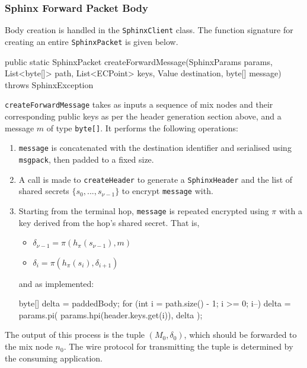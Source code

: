 \documentclass[final,dissertation.tex]{subfiles}
\begin{document}
\subsubsection{Sphinx Forward Packet Body}

Body creation is handled in the \verb|SphinxClient| class.  The function signature for creating an entire \verb|SphinxPacket| is given below.

\begin{javacode}
public static SphinxPacket createForwardMessage(SphinxParams params,
    List<byte[]> path,
    List<ECPoint> keys,
    Value destination,
    byte[] message) throws SphinxException
\end{javacode}

\verb|createForwardMessage| takes as inputs a sequence of mix nodes and their corresponding public keys as per the header generation section above, and a message $m$ of type \verb|byte[]|. It performs the following operations:

\begin{enumerate}
	\item \verb|message| is concatenated with the destination identifier and serialised using \verb|msgpack|, then padded to a fixed size.
	\item A call is made to \verb|createHeader| to generate a \verb|SphinxHeader| and the list of shared secrets $\{s_0,...,s_{\nu-1}\}$ to encrypt \verb|message| with.
	\item Starting from the terminal hop, \verb|message| is repeated encrypted using $\pi$ with a key derived from the hop's shared secret. That is,
		\begin{itemize}
			\setlength\itemsep{-0em}
			\item $\delta_{\nu-1} = \pi(h_\pi(s_{\nu-1}), m)$
			\item $\delta_i = \pi(h_\pi(s_{i}), \delta_{i+1})$
		\end{itemize}
	and as implemented:
	\begin{javacode}
byte[] delta = paddedBody;
for (int i = path.size() - 1; i >= 0; i--) {
    delta = params.pi(
        params.hpi(header.keys.get(i)), 
        delta
    );
}
	\end{javacode}
\end{enumerate}

The output of this process is the tuple $(M_0, \delta_0)$, which should be forwarded to the mix node $n_0$. The wire protocol for transmitting the tuple is determined by the consuming application. 
\end{document}
